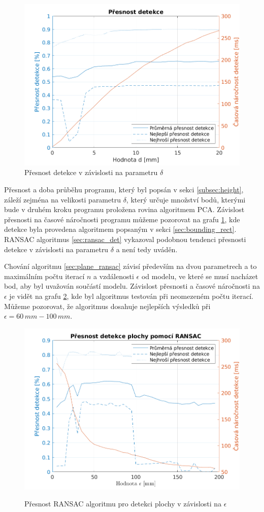 \documentclass[twoside]{ctuthesis}
\begin{document}
\begin{figure}
    \centering
    \includegraphics[width =0.8\linewidth]{pictures/normal_acc.png}
    \caption{Přesnost detekce v závislosti na parametru $\delta$}
    \label{fig:delta_detekce_normaly}
\end{figure}

Přesnost a doba průběhu programu, který byl popsán v sekci \ref{subsec:height}, záleží zejména na velikosti parametru $\delta$, který určuje množství bodů, kterými bude v druhém kroku programu proložena rovina algoritmem PCA. Závislost přesnosti na časové náročnosti programu můžeme pozorovat na grafu \ref{fig:delta_detekce_normaly}, kde detekce byla provedena algoritmem popsaným v sekci \ref{sec:bounding_rect}. RANSAC algoritmus \ref{sec:ransac_det} vykazoval podobnou tendenci přesnosti detekce v závislosti na parametru $\delta$ a není tedy uváděn.

Chování algoritmu \ref{sec:plane_ransac} závisí především na dvou parametrech a to maximálním počtu iterací $n$ a vzdálenosti $\epsilon$ od modelu, ve které se musí nacházet bod, aby byl uvažován součástí modelu. Závislost přesnosti a časové náročnosti na $\epsilon$ je vidět na grafu \ref{fig:plane_ransac}, kde  byl algoritmus testován při neomezeném počtu iterací. Můžeme pozorovat, že algoritmus dosahuje nejlepších výsledků při $\epsilon = 60\,mm - 100\,mm$.

\begin{figure}
  \centering
  \includegraphics[width=0.8\linewidth]{pictures/plane_ransac.png}
  \label{subfig:epsilon}
  \caption{Přesnost RANSAC algoritmu pro detekci plochy v závislosti na $\epsilon$}
\label{fig:plane_ransac}
\end{figure}
\end{document}
